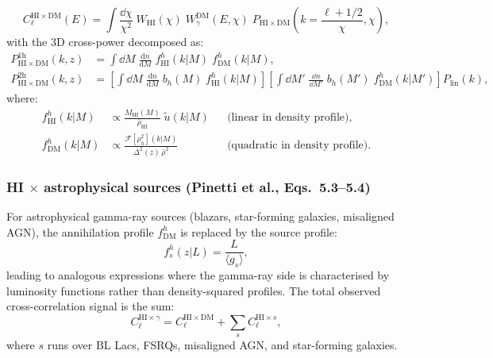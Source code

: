\documentclass[10pt,a4paper]{article}
\newcommand{\Cl}{C_\ell}
\newcommand{\ddn}{\frac{\mathrm{d}n}{\mathrm{d}M}}
\newcommand{\rhobar}{\bar{\rho}}
\newcommand{\Plin}{P_{\mathrm{lin}}}
\newcommand{\utilde}{\tilde{u}}
\begin{document}
\begin{equation}
\label{eq:Cl_HI_DM}
\Cl^{\mathrm{HI} \times \mathrm{DM}}(E) = \int \frac{\dd\chi}{\chi^2} \; W_{\mathrm{HI}}(\chi) \; W_\gamma^{\mathrm{DM}}(E, \chi) \; P_{\mathrm{HI} \times \mathrm{DM}}\!\left(k = \frac{\ell + 1/2}{\chi}, \chi\right),
\end{equation}
with the 3D cross-power decomposed as:
\begin{align}
P_{\mathrm{HI} \times \mathrm{DM}}^{\mathrm{1h}}(k, z) &= \int \dd M \; \ddn \; f_{\mathrm{HI}}^h(k | M) \; f_{\mathrm{DM}}^h(k | M), \label{eq:P_HI_DM_1h} \\
P_{\mathrm{HI} \times \mathrm{DM}}^{\mathrm{2h}}(k, z) &= \left[\int \dd M \; \ddn \; b_h(M) \; f_{\mathrm{HI}}^h(k | M)\right] \left[\int \dd M' \; \frac{\dd n}{\dd M'} \; b_h(M') \; f_{\mathrm{DM}}^h(k | M')\right] \Plin(k), \label{eq:P_HI_DM_2h}
\end{align}
where:
\begin{align}
f_{\mathrm{HI}}^h(k | M) &\propto \frac{M_{\mathrm{HI}}(M)}{\rhobar_{\mathrm{HI}}} \; \utilde(k | M) & &\text{(linear in density profile)}, \\
f_{\mathrm{DM}}^h(k | M) &\propto \frac{\mathcal{F}[\rho_h^2](k | M)}{\Delta^2(z) \, \rhobar^2} & &\text{(quadratic in density profile)}.
\end{align}

\subsubsection{HI $\times$ astrophysical sources (Pinetti et al., Eqs.~5.3--5.4)}

For astrophysical gamma-ray sources (blazars, star-forming galaxies, misaligned AGN), the annihilation profile $f_{\mathrm{DM}}^h$ is replaced by the source profile:
\begin{equation}
f_s^h(z | L) = \frac{L}{\langle g_s \rangle},
\end{equation}
leading to analogous expressions where the gamma-ray side is characterised by luminosity functions rather than density-squared profiles. The total observed cross-correlation signal is the sum:
\begin{equation}
\label{eq:Cl_total}
\Cl^{\mathrm{HI} \times \gamma} = \Cl^{\mathrm{HI} \times \mathrm{DM}} + \sum_s \Cl^{\mathrm{HI} \times s},
\end{equation}
where $s$ runs over BL Lacs, FSRQs, misaligned AGN, and star-forming galaxies.


\end{document}
